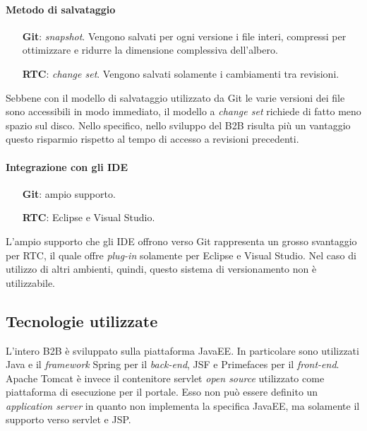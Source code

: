 \paragraph*{Metodo di salvataggio}
\begin{itemize}
	\item[\textbf{Git}:] \textit{snapshot}. Vengono salvati per ogni versione i file interi, compressi per ottimizzare e ridurre la dimensione complessiva dell'albero.
	\item[\textbf{RTC}:] \textit{change set}. Vengono salvati solamente i cambiamenti tra revisioni.
\end{itemize}
Sebbene con il modello di salvataggio utilizzato da Git le varie versioni dei file sono accessibili in modo immediato, il modello a \textit{change set} richiede di fatto meno spazio sul disco. Nello specifico, nello sviluppo del B2B risulta più un vantaggio questo risparmio rispetto al tempo di accesso a revisioni precedenti. 

\paragraph*{Integrazione con gli IDE}
\begin{itemize}
	\item[\textbf{Git}:] ampio supporto. 
	\item[\textbf{RTC}:] Eclipse e Visual Studio.
\end{itemize}
L'ampio supporto che gli IDE offrono verso Git rappresenta un grosso svantaggio per RTC, il quale offre \textit{plug-in} solamente per Eclipse e Visual Studio. Nel caso di utilizzo di altri ambienti, quindi, questo sistema di versionamento non è utilizzabile.

\subsection{Tecnologie utilizzate}
L'intero B2B è sviluppato sulla piattaforma \Gls{JavaEE}. In particolare sono utilizzati Java e il \textit{framework} Spring per il \textit{back-end}, JSF e Primefaces per il \textit{front-end}. Apache Tomcat è invece il contenitore \gls{servlet} \textit{open source} utilizzato come piattaforma di esecuzione per il portale. Esso non può essere definito un \textit{application server} in quanto non implementa la specifica JavaEE, ma solamente il supporto verso servlet e \Gls{JSP}.

